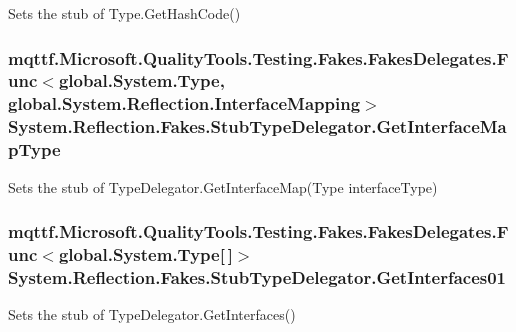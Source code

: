Sets the stub of Type.\-Get\-Hash\-Code()

\hypertarget{class_system_1_1_reflection_1_1_fakes_1_1_stub_type_delegator_a4d0f29c70850e6302f6059dc9917ebb5}{
\subsubsection[{Get\-Interface\-Map\-Type}]{\setlength{\rightskip}{0pt plus 5cm}mqttf.\-Microsoft.\-Quality\-Tools.\-Testing.\-Fakes.\-Fakes\-Delegates.\-Func$<$global.\-System.\-Type, global.\-System.\-Reflection.\-Interface\-Mapping$>$ System.\-Reflection.\-Fakes.\-Stub\-Type\-Delegator.\-Get\-Interface\-Map\-Type}}\label{class_system_1_1_reflection_1_1_fakes_1_1_stub_type_delegator_a4d0f29c70850e6302f6059dc9917ebb5}


Sets the stub of Type\-Delegator.\-Get\-Interface\-Map(\-Type interface\-Type)

\hypertarget{class_system_1_1_reflection_1_1_fakes_1_1_stub_type_delegator_aa27921bffedede35c29e603ac2b08785}{
\subsubsection[{Get\-Interfaces01}]{\setlength{\rightskip}{0pt plus 5cm}mqttf.\-Microsoft.\-Quality\-Tools.\-Testing.\-Fakes.\-Fakes\-Delegates.\-Func$<$global.\-System.\-Type\mbox{[}$\,$\mbox{]}$>$ System.\-Reflection.\-Fakes.\-Stub\-Type\-Delegator.\-Get\-Interfaces01}}\label{class_system_1_1_reflection_1_1_fakes_1_1_stub_type_delegator_aa27921bffedede35c29e603ac2b08785}


Sets the stub of Type\-Delegator.\-Get\-Interfaces()

